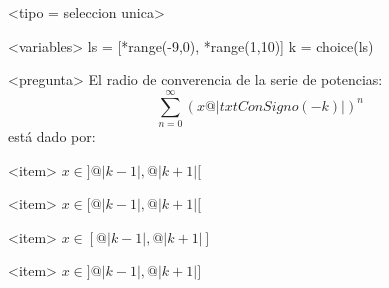 <tipo = seleccion unica>

<variables>
ls = [*range(-9,0), *range(1,10)]
k = choice(ls)

<pregunta>
El radio de converencia de la serie de potencias:
\[ \sum_{n=0}^\infty ( x @|txtConSigno(-k)| )^n \]
est\'a dado por:

<item>
$x \in ]@|k - 1|, @|k+1|[$

<item>
$x \in [@|k - 1|, @|k+1|[$

<item>
$x \in [@|k - 1|, @|k+1|]$

<item>
$x \in ]@|k - 1|, @|k+1|]$

